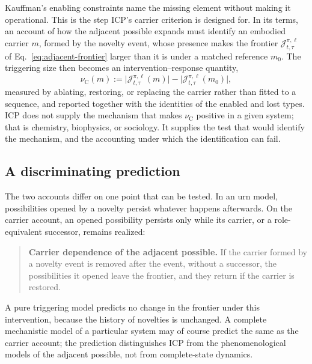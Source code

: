 Kauffman's enabling constraints name the missing element without making it
operational. This is the step ICP's carrier criterion is designed for. In its
terms, an account of how the adjacent possible expands must identify an
embodied carrier $m$, formed by the novelty event, whose presence makes the
frontier $\mathcal J^{\pi,\ell}_{t,\tau}$ of Eq.~\eqref{eq:adjacent-frontier}
larger than it is under a matched reference $m_0$. The triggering size then
becomes an intervention--response quantity,
\begin{equation}
 \nu_{\mathrm{C}}(m)
 :=\bigl|\mathcal J^{\pi,\ell}_{t,\tau}(m)\bigr|
  -\bigl|\mathcal J^{\pi,\ell}_{t,\tau}(m_0)\bigr|,
 \label{eq:carrier-triggering}
\end{equation}
measured by ablating, restoring, or replacing the carrier rather than fitted to
a sequence, and reported together with the identities of the enabled and lost
types. ICP does not supply the mechanism that makes $\nu_{\mathrm{C}}$ positive
in a given system; that is chemistry, biophysics, or sociology. It supplies the
test that would identify the mechanism, and the accounting under which the
identification can fail.

\subsection{A discriminating prediction}

The two accounts differ on one point that can be tested. In an urn model,
possibilities opened by a novelty persist whatever happens afterwards. On the
carrier account, an opened possibility persists only while its carrier, or a
role-equivalent successor, remains realized:
\begin{quote}
\textbf{Carrier dependence of the adjacent possible.} If the carrier formed by
a novelty event is removed after the event, without a successor, the
possibilities it opened leave the frontier, and they return if the carrier is
restored.
\end{quote}
A pure triggering model predicts no change in the frontier under this
intervention, because the history of novelties is unchanged. A complete
mechanistic model of a particular system may of course predict the same as the
carrier account; the prediction distinguishes ICP from the phenomenological
models of the adjacent possible, not from complete-state dynamics.

